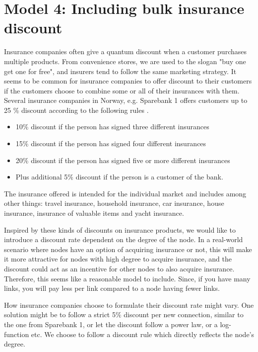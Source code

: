 \section{Model 4: Including bulk insurance discount}

Insurance companies often give a quantum discount when a customer purchases multiple products. From convenience stores, we are used to the slogan "buy one get one for free", and insurers tend to follow the same marketing strategy. It seems to be common for insurance companies to offer discount to their customers if the customers choose to combine some or all of their insurances with them. Several insurance companies in Norway, e.g. Sparebank 1 offers customers up to 25 $\%$ discount according to the following rules \cite{sparebank1}. 

\begin{itemize}

\item 10$\%$ discount if the person has signed three different insurances
\item 15$\%$ discount if the person has signed four different insurances
\item 20$\%$ discount if the person has signed five or more different insurances
\item Plus additional 5$\%$ discount if the person is a customer of the bank. 

\end{itemize}

The insurance offered is intended for the individual market and includes among other things: travel insurance, household insurance, car insurance, house insurance, insurance of valuable items and yacht insurance.

Inspired by these kinds of discounts on insurance products, we would like to introduce a discount rate dependent on the degree of the node. In a real-world scenario where nodes have an option of acquiring insurance or not, this will make it more attractive for nodes with high degree to acquire insurance, and the discount could act as an incentive for other nodes to also acquire insurance. Therefore, this seems like a reasonable model to include. Since, if you have many links, you will pay less per link compared to a node having fewer links.

How insurance companies choose to formulate their discount rate might vary. One solution might be to follow a strict 5$\%$ discount per new connection, similar to the one from Sparebank 1, or let the discount follow a power law, or a log-function etc. We choose to follow a discount rule which directly reflects the node's degree.
